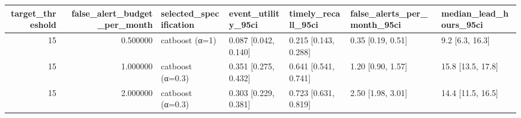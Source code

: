 \begin{tabular}{rrlllll}
\toprule
target\_threshold & false\_alert\_budget\_per\_month & selected\_specification & event\_utility\_95ci & timely\_recall\_95ci & false\_alerts\_per\_month\_95ci & median\_lead\_hours\_95ci \\
\midrule
15 & 0.500000 & catboost (α=1) & 0.087 [0.042, 0.140] & 0.215 [0.143, 0.288] & 0.35 [0.19, 0.51] & 9.2 [6.3, 16.3] \\
15 & 1.000000 & catboost (α=0.3) & 0.351 [0.275, 0.432] & 0.641 [0.541, 0.741] & 1.20 [0.90, 1.57] & 15.8 [13.5, 17.8] \\
15 & 2.000000 & catboost (α=0.3) & 0.303 [0.229, 0.381] & 0.723 [0.631, 0.819] & 2.50 [1.98, 3.01] & 14.4 [11.5, 16.5] \\
\bottomrule
\end{tabular}
